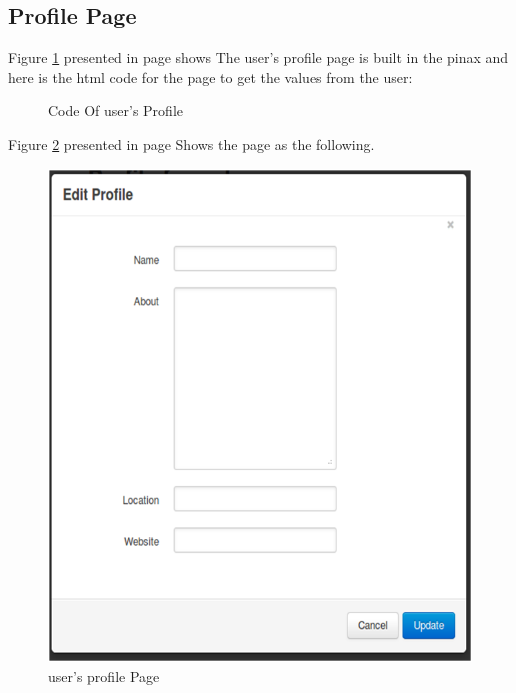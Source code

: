 \documentclass[12pt,a4paper,class,twoside,openany]{report}
\begin{document}
{\subsection{ Profile Page}
Figure \ref{fg:4-24} presented in page \pageref{fg:4-24} shows The user's profile page is built in the pinax and here is the html code for the page to get the values from the user:
\begin{figure}
\begin{center}
\caption{ Code Of user's Profile }
\label{fg:4-24}
\end{center}
\end{figure} 
Figure \ref{fg:4-25} presented in page \pageref{fg:4-25} Shows the page as the following.
\begin{figure}
\begin{center}
\includegraphics[height=4 in]{4-25}
\caption{ user's profile Page }
\label{fg:4-25}
\end{center}
\end{figure}  
}
\end{document}
